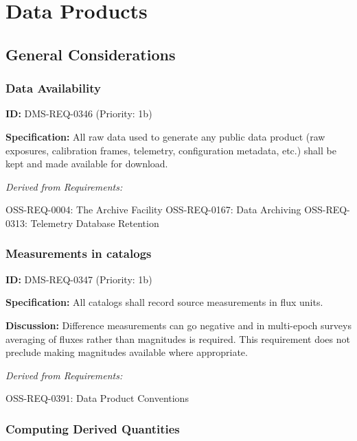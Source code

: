 \documentclass[SE,toc,lsstdraft]{lsstdoc}
\begin{document}
\section{Data Products}

\subsection{General Considerations}

\subsubsection{Data Availability}

\label{DMS-REQ-0346}
\textbf{ID:} DMS-REQ-0346 (Priority: 1b)

\textbf{Specification: }All raw data used to generate any public data product (raw exposures, calibration frames, telemetry, configuration metadata, etc.) shall be kept and made available for download.

\emph{Derived from Requirements:}

OSS-REQ-0004:
The Archive Facility \newline
OSS-REQ-0167:
Data Archiving \newline
OSS-REQ-0313:
Telemetry Database Retention \newline

\subsubsection{Measurements in catalogs}

\label{DMS-REQ-0347}
\textbf{ID:} DMS-REQ-0347 (Priority: 1b)

\textbf{Specification: }All catalogs shall record source measurements in flux units.

\textbf{Discussion: }Difference measurements can go negative and in multi-epoch surveys averaging of fluxes rather than magnitudes is required. This requirement does not preclude making magnitudes available where appropriate.

\emph{Derived from Requirements:}

OSS-REQ-0391:
Data Product Conventions \newline

\subsubsection{Computing Derived Quantities}
\end{document}
